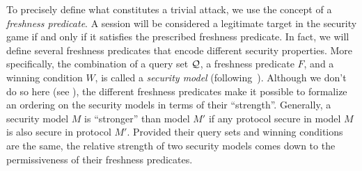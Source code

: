 To precisely define what constitutes a trivial attack,
we use the concept of a \emph{freshness predicate}.
A session will be considered a legitimate target in the security game if
and only if
it satisfies the prescribed freshness predicate.
In fact,
we will define several freshness predicates that encode different security properties.
More specifically,
the combination of a query set $\mathcal{Q}$, 
a freshness predicate $F$,
and a winning condition $W$,
is called a \emph{security model} (following~\cite{ESORICS:CreFel12}).
Although we don't do so here (see \cite{ESORICS:CreFel12,EPRINT:FelCre14}),
the different freshness predicates make it possible to formalize an ordering on the security models in terms of their ``strength''.
Generally, a security model $M$ is ``stronger'' than model $M'$ if any protocol secure in model $M$ is also secure in protocol $M'$.
Provided their query sets and winning conditions are the same,
the relative strength of two security models comes down to the permissiveness of their freshness predicates.

%
%
%
%



